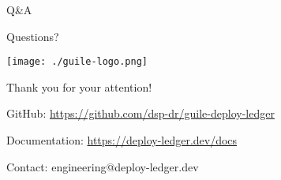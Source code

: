 \documentclass[presentation,aspectratio=169]{beamer}
\begin{document}
\begin{frame}[label={sec:org959f1c6}]{Q\&A}
\begin{block}{Questions?}
\begin{center}
\begin{center}
\texttt{[image: ./guile-logo.png]}
\end{center}

Thank you for your attention!

GitHub: \url{https://github.com/dsp-dr/guile-deploy-ledger}

Documentation: \url{https://deploy-ledger.dev/docs}

Contact: engineering@deploy-ledger.dev
\end{center}
\end{block}
\end{frame}
\end{document}

